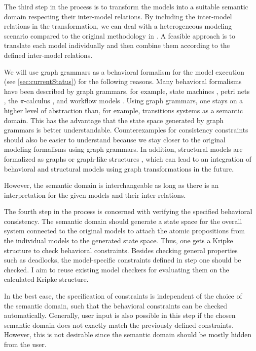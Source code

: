 \documentclass[conference]{IEEEtran}
\begin{document}
The third step in the process is to transform the models into a suitable semantic domain respecting their inter-model relations.
By including the inter-model relations in the transformation, we can deal with a heterogeneous modeling scenario compared to the original methodology in \cite{engelsMethodologySpecifyingAnalyzing2001}.
A feasible approach is to translate each model individually and then combine them according to the defined inter-model relations.

We will use graph grammars as a behavioral formalism for the model execution (see \autoref{sec:currentStatus}) for the following reasons.
Many behavioral formalisms have been described by graph grammars, for example, state machines \cite{kuskeFormalSemanticsUML2001, varroFormalSemanticsUML2002}, petri nets \cite{ehrigGraphGrammarsPetri2004}, the $\pi$-calculus \cite{gadducciGraphRewritingPcalculus2007}, and workflow models \cite{rutleMetamodellingApproachBehavioural2012}.
Using graph grammars, one stays on a higher level of abstraction than, for example, transitions systems as a semantic domain.
This has the advantage that the state space generated by graph grammars is better understandable.
Counterexamples for consistency constraints should also be easier to understand because we stay closer to the original modeling formalisms using graph grammars.
In addition, structural models are formalized as graphs or graph-like structures \cite{stunkelMultipleModelSynchronization2020}, which can lead to an integration of behavioral and structural models using graph transformations in the future. 

However, the semantic domain is interchangeable as long as there is an interpretation for the given models and their inter-relations.

The fourth step in the process is concerned with verifying the specified behavioral consistency.
The semantic domain should generate a state space for the overall system connected to the original models to attach the atomic propositions from the individual models to the generated state space.
Thus, one gets a Kripke structure to check behavioral constraints.
Besides checking general properties such as deadlocks, the model-specific constraints defined in step one should be checked.
I aim to reuse existing model checkers for evaluating them on the calculated Kripke structure.

In the best case, the specification of constraints is independent of the choice of the semantic domain, such that the behavioral constraints can be checked automatically.
Generally, user input is also possible in this step if the chosen semantic domain does not exactly match the previously defined constraints.
However, this is not desirable since the semantic domain should be mostly hidden from the user.
\end{document}
